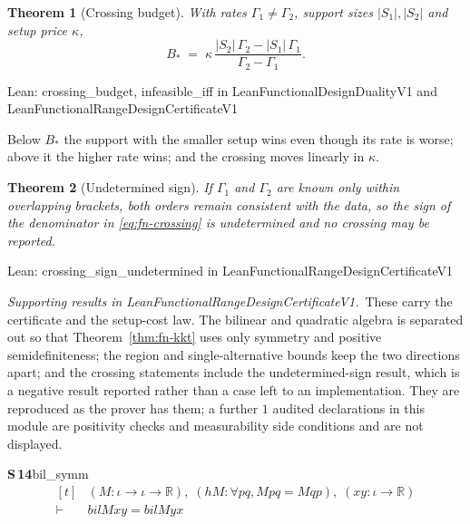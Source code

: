 \documentclass[conference]{IEEEtran}
\newtheorem{theorem}{Theorem}
\theoremstyle{definition}
\newcommand{\lean}[1]{\textsf{\footnotesize #1}}
\newcommand{\leanbox}[1]{%
  \par\vspace{2pt}\noindent
  {\footnotesize\textsf{Lean: #1}}\par\vspace{2pt}}
\begin{document}
\begin{theorem}[Crossing budget]
\label{thm:fn-crossing}
With rates $\Gamma_{1}\neq\Gamma_{2}$, support sizes $|S_{1}|,|S_{2}|$ and setup price
$\kappa$,
\begin{equation}
B_{*}\;=\;\kappa\,\frac{|S_{2}|\,\Gamma_{2}-|S_{1}|\,\Gamma_{1}}{\Gamma_{2}-\Gamma_{1}} .
\label{eq:fn-crossing}
\end{equation}
\end{theorem}

\leanbox{\lean{crossing\_budget}, \lean{infeasible\_iff} in
\lean{LeanFunctionalDesignDualityV1} and
\lean{LeanFunctionalRangeDesignCertificateV1}}

Below $B_{*}$ the support with the smaller setup wins even though its rate is worse; above it
the higher rate wins; and the crossing moves linearly in $\kappa$.

\begin{theorem}[Undetermined sign]
\label{thm:fn-undecided}
If $\Gamma_{1}$ and $\Gamma_{2}$ are known only within overlapping brackets, both orders
remain consistent with the data, so the sign of the denominator in \eqref{eq:fn-crossing} is
undetermined and no crossing may be reported.
\end{theorem}

\leanbox{\lean{crossing\_sign\_undetermined} in
\lean{LeanFunctionalRangeDesignCertificateV1}}

\noindent\emph{Supporting results in \lean{LeanFunctionalRangeDesignCertificateV1}.}~These carry the certificate and the setup-cost law. The bilinear and quadratic algebra is separated out so that Theorem~\ref{thm:fn-kkt} uses only symmetry and positive semidefiniteness; the region and single-alternative bounds keep the two directions apart; and the crossing statements include the undetermined-sign result, which is a negative result reported rather than a case left to an implementation. They are reproduced as the prover has them; a further $1$ audited declarations in this module are positivity checks and measurability side conditions and are not displayed.

\noindent\textbf{S\,14}\quad\lean{bil\_symm}
{\footnotesize\[ \begin{aligned}[t]
&(\mathit{M} : \iota \to \iota \to \mathbb{R} ),\; (\mathit{hM} : \forall \mathit{p} \mathit{q}, \mathit{M} \mathit{p} \mathit{q} = \mathit{M} \mathit{q} \mathit{p}),\; (\mathit{x} \mathit{y} : \iota \to \mathbb{R} )\\
\vdash\;&\mathit{bil} \mathit{M} \mathit{x} \mathit{y} = \mathit{bil} \mathit{M} \mathit{y} \mathit{x}
\end{aligned} \]}
\end{document}
